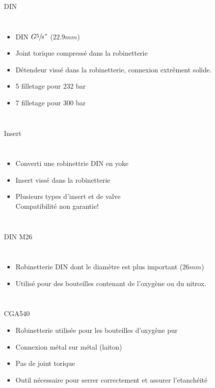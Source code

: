 \documentclass[aspectratio=1610,english,12pt]{beamer}
\begin{document}
\begin{frame}{DIN}
	\begin{columns}[onlytextwidth]
			\begin{itemize}
			 	\item DIN $G\sfrac{5}{8}"$ ($22.9mm$)
			 	\item Joint torique compressé dans la robinetterie
			 	\item Détendeur vissé dans la robinetterie, connexion extrêment solide.
			 	\item 5 filletage pour 232 bar
			 	\item 7 filletage pour 300 bar
			\end{itemize}	 
	\end{columns}
\end{frame}

\begin{frame}{Insert}
	\begin{columns}[onlytextwidth]
			\begin{itemize}
			 	\item Converti une robinettrie DIN en yoke
			 	\item Insert vissé dans la  robinetterie
			 	\item Plusieurs types d'insert et de valve\\Compatibilité non garantie!
			\end{itemize}
	\end{columns}
\end{frame}

\begin{frame}{DIN M26}
	\begin{columns}[onlytextwidth]
			\begin{itemize}
				\item Robinetterie DIN dont le diamètre est plus important ($26mm$)
				\item Utilisé pour des bouteilles contenant de l'oxygène ou du nitrox.
			\end{itemize}
	\end{columns}
\end{frame}

\begin{frame}{CGA540}
	\begin{itemize}
		\item Robinetterie utilisée pour les bouteilles d'oxygène pur
		\item Connexion métal sur métal (laiton)
		\item Pas de joint torique
		\item Outil nécessaire pour serrer correctement et assurer l'etanchéité
	\end{itemize}
	\begin{columns}
	\end{columns}
\end{frame}
\end{document}
